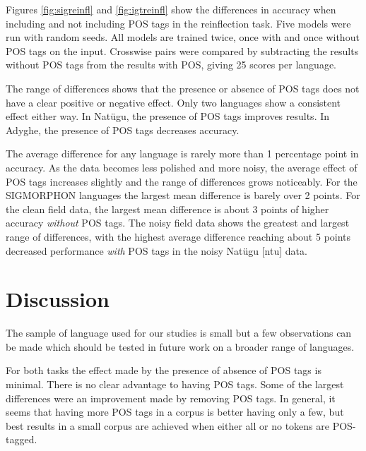 Figures \ref{fig:sigreinfl} and \ref{fig:igtreinfl} show the differences in accuracy when including and not including POS tags in the reinflection task. Five models were run with random seeds. All models are trained twice, once with and once without POS tags on the input. Crosswise pairs were compared by subtracting the results without POS tags from the results with POS, giving 25 scores per language. 

The range of differences shows that the presence or absence of POS tags does not have a clear positive or negative effect. Only two languages show a consistent effect either way. In Nat\"ugu, the presence of POS tags improves results. In Adyghe, the presence of POS tags decreases accuracy.

The average difference for any language is rarely more than 1 percentage point in accuracy. As the data becomes less polished and more noisy, the average effect of POS tags increases slightly and the range of differences grows noticeably. For the SIGMORPHON languages the largest mean difference is barely over 2 points. For the clean field data, the largest mean difference is about 3 points of higher accuracy \textit{without} POS tags. The noisy field data shows the greatest and largest range of differences, with the highest average difference reaching about 5 points decreased performance \textit{with} POS tags in the noisy Nat\"ugu [ntu] data.




\section{Discussion}

The sample of language used for our studies is small but a few observations can be made which should be tested in future work on a broader range of languages.

For both tasks the effect made by the presence of absence of POS tags is minimal. There is no clear advantage to having POS tags. Some of the largest differences were an improvement made by removing POS tags. In general, it seems that having more POS tags in a corpus is better having only a few, but best results in a small corpus are achieved when either all or no tokens are POS-tagged. 

